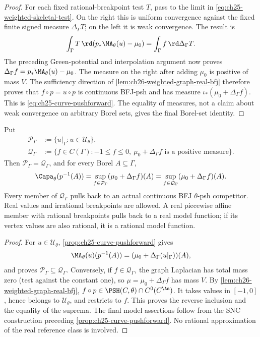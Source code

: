 \begin{proof}
For each fixed rational-breakpoint test \(T\), pass to the limit in
\eqref{eq:ch25-weighted-skeletal-test}.  On the right this is uniform
convergence against the fixed finite signed measure
\(\Delta_\Gamma T\); on the left it is weak convergence.
The result is
\[
 \int_\Gamma T\,\rd(p_*\MA_\theta(u)-\mu_0)
       =\int_\Gamma f\,\rd\Delta_\Gamma T.
\]
The preceding Green-potential and interpolation argument now proves
\(\Delta_\Gamma f=p_*\MA_\theta(u)-\mu_0\).
The measure on the right after adding \(\mu_0\) is positive of mass
\(V\).  The sufficiency direction of
\cref{lem:ch26-weighted-graph-real-bfj} therefore proves that
\(f\circ p=u\circ p\) is continuous BFJ-psh and has measure
\(\iota_*(\mu_0+\Delta_\Gamma f)\).  This is
\eqref{eq:ch25-curve-pushforward}.  The equality of measures, not a
claim about weak convergence on arbitrary Borel sets, gives the
final Borel-set identity.
\end{proof}

\begin{corollary}
\label{cor:ch25-curve-capacity-formula}
Put
\[
 \begin{aligned}
 \mathcal P_\Gamma
  &:=\{u|_\Gamma:u\in\mathcal U_\theta\},\\
 \mathcal Q_\Gamma
  &:=\{f\in C(\Gamma): -1\leq f\leq0,\
                \mu_0+\Delta_\Gamma f\text{ is a positive measure}\}.
 \end{aligned}
\]
Then \(\mathcal P_\Gamma=\mathcal Q_\Gamma\), and for every Borel
\(A\subseteq\Gamma\),
\begin{equation}
\label{eq:ch25-curve-capacity}
 \Capa_\theta(p^{-1}(A))
   =\sup_{f\in\mathcal P_\Gamma}(\mu_0+\Delta_\Gamma f)(A)
   =\sup_{f\in\mathcal Q_\Gamma}(\mu_0+\Delta_\Gamma f)(A).
\end{equation}
Every member of \(\mathcal Q_\Gamma\) pulls back to an actual
continuous BFJ \(\theta\)-psh competitor.  Real values and irrational
breakpoints are allowed.  A real piecewise affine member with
rational breakpoints pulls back to a real model function; if its
vertex values are also rational, it is a rational model function.
\end{corollary}

\begin{proof}
For \(u\in\mathcal U_\theta\),
\cref{prop:ch25-curve-pushforward} gives
\[
 \MA_\theta(u)(p^{-1}(A))
   =(\mu_0+\Delta_\Gamma(u|_\Gamma))(A),
\]
and proves \(\mathcal P_\Gamma\subseteq\mathcal Q_\Gamma\).
Conversely, if \(f\in\mathcal Q_\Gamma\), the graph Laplacian has
total mass zero (test against the constant one), so
\(\mu=\mu_0+\Delta_\Gamma f\) has mass \(V\).
By \cref{lem:ch26-weighted-graph-real-bfj},
\(f\circ p\in\PSH(C,\theta)\cap C^0(C^{\An})\).
It takes values in \([-1,0]\), hence belongs to
\(\mathcal U_\theta\), and restricts to \(f\).
This proves the reverse inclusion and the equality of the suprema.
The final model assertions follow from the SNC construction preceding
\cref{prop:ch25-curve-pushforward}.  No rational approximation of the
real reference class is involved.
\end{proof}

